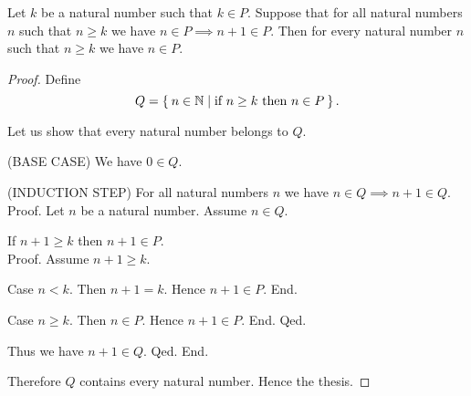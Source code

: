 \documentclass[../../arithmetic.tex]{subfiles}
\begin{document}
  \begin{forthel}
    \begin{theorem}\label{Arithmetic_02_05_497603}
      Let $k$ be a natural number such that $k \in P$.
      Suppose that for all natural numbers $n$ such that $n \geq k$ we have $n \in P \implies n + 1 \in P$.
      Then for every natural number $n$ such that $n \geq k$ we have $n \in P$.
    \end{theorem}
    \begin{proof}
      Define \[ Q = \Set{n \in \mathbb{N} | \text{if $n \geq k$ then $n \in P$}}. \]

      Let us show that every natural number belongs to $Q$.

        (BASE CASE) We have $0 \in Q$.

        (INDUCTION STEP) For all natural numbers $n$ we have $n \in Q \implies n + 1 \in Q$. \\
        Proof.
          Let $n$ be a natural number.
          Assume $n \in Q$.

          If $n + 1 \geq k$ then $n + 1 \in P$. \\
          Proof.
            Assume $n + 1 \geq k$.

            Case $n < k$.
              Then $n + 1 = k$.
              Hence $n + 1 \in P$.
            End.

            Case $n \geq k$.
              Then $n \in P$.
              Hence $n + 1 \in P$.
            End.
          Qed.

          Thus we have $n + 1 \in Q$.
        Qed.
      End.

      Therefore $Q$ contains every natural number.
      Hence the thesis.
    \end{proof}
  \end{forthel}
\end{document}
